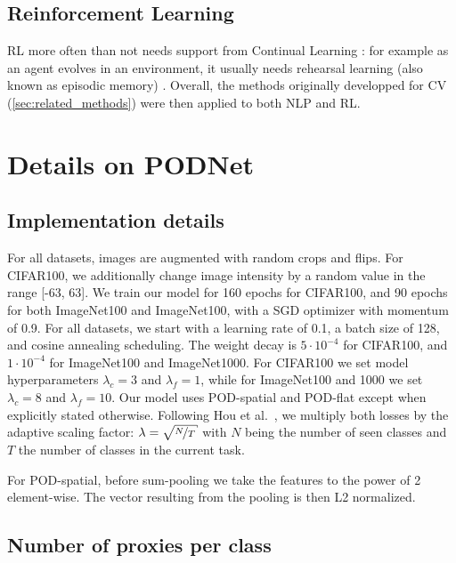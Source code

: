 \subsection{Reinforcement Learning}
\label{sec:related_rl}


\ac{RL} \citep{sutton1998rl} more often than not needs support from Continual
Learning \citep{khetarpal2020continualrl}: for example as an agent evolves in an environment, it
usually needs rehearsal learning (also known as episodic memory) \citep{mnih2013atarirl}. Overall,
the methods originally developped for \ac{CV} (\autoref{sec:related_methods}) were then applied to
both \ac{NLP} and \ac{RL}.


\section{Details on PODNet}
\label{sec:appendix_podnet}

\subsection{Implementation details}

For all datasets, images are augmented with random crops and flips. For CIFAR100, we additionally
change image intensity by a random value in the range [-63, 63].
%
We train our model for 160 epochs for CIFAR100, and 90 epochs for both ImageNet100 and ImageNet100,
with a SGD optimizer with momentum of 0.9. For all datasets, we start with a learning rate of 0.1, a
batch size of 128, and cosine annealing scheduling.
%
The weight decay is $5\cdot 10^{-4}$ for CIFAR100, and $1\cdot 10^{-4}$ for ImageNet100 and
ImageNet1000. For CIFAR100 we set model hyperparameters $\lambda_c = 3$ and $\lambda_f=1$, while for
ImageNet100 and 1000 we set $\lambda_c = 8$ and $\lambda_f =10$. Our model uses POD-spatial and
POD-flat except when explicitly stated otherwise. Following Hou et al.~\cite{hou2019ucir}, we
multiply both losses by the adaptive scaling factor: $\lambda=\sqrt{\nicefrac{N}{T}}$ with $N$ being
the number of seen classes and $T$ the number of classes in the current task.

For POD-spatial, before sum-pooling we take the features to the power of 2 element-wise. The vector
resulting from the pooling is then L2 normalized.

\subsection{Number of proxies per class}

